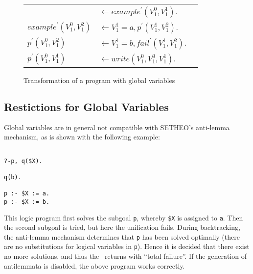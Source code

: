\begin{figure}[htb]
\begin{center}
\begin{tabular}{lll}
& $\leftarrow example^\prime(V_1^0,V_1^1)$. & \\
$example^\prime(V_1^0,V_1^2)$ & $\leftarrow V_1^1 = a , p^\prime(V_1^1,V_1^2)$. & \\
$p^\prime(V_1^0,V_1^2)$ & $\leftarrow V_1^1 = b , fail^\prime(V_1^1,V_1^2)$. & \\
$p^\prime(V_1^0,V_1^1)$ & $\leftarrow write(V_1^0,V_1^0,V_1^1)$. & \\
\end{tabular}
\end{center}
\caption{Transformation of a program with global variables}
\end{figure}

\subsection{Restictions for Global Variables}

Global variables are in general not compatible with SETHEO's
anti-lemma mechanism, as is shown with the following example:

\begin{verbatim}

?-p, q($X).

q(b).

p :- $X := a.
p :- $X := b.
\end{verbatim}

This logic program first solves the subgoal {\tt p}, whereby {\tt \$X}
is assigned to {\tt a}. Then the second subgoal is tried, but here
the unification fails. During backtracking, the anti-lemma mechanism
determines that {\tt p} has been solved optimally (there are no substitutions
for logical variables in {\tt p}). Hence it is decided that there exist no
more solutions, and thus the \SAM\ returns with ``total failure''.
If the generation of antilemmata is disabled, the above program works
correctly.
